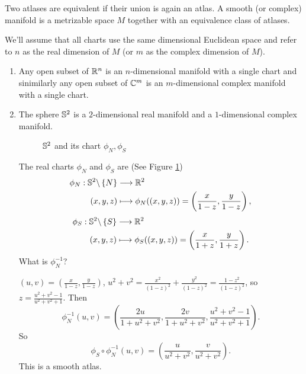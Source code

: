 Two atlases are equivalent if their union is again an atlas. A smooth (or complex) manifold is a metrizable space $M$ together with an equivalence class of atlases.  

We'll assume that all charts use the same dimensional Euclidean space and refer to $n$ as the real dimension of $M$ (or $m$ as the complex dimension of $M$).

\begin{example}
  \begin{enumerate}
    \item Any open subset of $\mathbb{R}^{n}$ is an $n$-dimensional manifold with a single chart and sinimilarly any open subset of $\mathbb{C}^{m}$ is an  $m$-dimensional complex manifold with a single chart.
    \item The sphere $\mathbb{S}^2$ is a $2$-dimensional real manifold and a $1$-dimensional complex manifold.

\begin{figure}[ht]
    \centering
    \caption{$\mathbb{S}^2$ and its chart $\phi_N,\phi_S$ }
    \label{fig:sphere}
\end{figure}
The real charts $\phi_N$ and $\phi_S$ are (See Figure \ref{fig:sphere})
      \begin{align*}
        \phi_N: \mathbb{S}^2 \backslash \left\{N\right\}  &\longrightarrow \mathbb{R}^2 \\
	(x,y,z) &\longmapsto \phi_N(	(x,y,z)) = \left( \frac{x}{1-z},\frac{y}{1-z} \right) 
      ,\end{align*}
      \begin{align*}
        \phi_S: \mathbb{S}^2 \backslash \left\{S\right\}  &\longrightarrow \mathbb{R}^2 \\
	(x,y,z) &\longmapsto \phi_S(	(x,y,z)) = \left( \frac{x}{1+z},\frac{y}{1+z} \right) 
      .\end{align*}
  What is $\phi_N^{-1}$?
  
  $(u,v)=\left( \frac{x}{1-z},\frac{y}{1-z} \right) $, $u^2+v^2=\frac{x^2}{(1-z)^2}+\frac{y^2}{(1-z)^2}=\frac{1-z^2}{(1-z)^2}$, so $z= \frac{u^2+v^2-1}{u^2+v^2+1}$. Then 
  \[
    \phi_{N}^{-1}(u,v)=\left( \frac{2u}{1+u^2+v^2}, \frac{2v}{1+u^2+v^2}, \frac{u^2+v^2-1}{u^2+v^2+1} \right) .
  \] 
  So 
  \[
    \phi_S\circ \phi_{N}^{-1}(u,v)=\left( \frac{u}{u^2+v^2},\frac{v}{u^2+v^2} \right) .
  \]
  This is a smooth atlas.


\end{enumerate}
\end{example}
